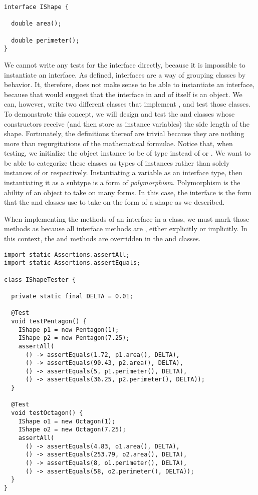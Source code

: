 \begin{lstlisting}[language=MyJava]
interface IShape {

  double area();

  double perimeter();
}
\end{lstlisting}

We cannot write any tests for the  interface directly, because it is impossible to instantiate an interface. 
As defined, interfaces are a way of grouping classes by behavior. 
It, therefore, does not make sense to be able to instantiate an interface, because that would suggest that the interface in and of itself is an object.
We can, however, write two different classes that implement , and test those classes. 
To demonstrate this concept, we will design and test the  and  classes whose constructors receive (and then store as instance variables) the side length of the shape. 
Fortunately, the definitions thereof are trivial because they are nothing more than regurgitations of the mathematical formulae. 
Notice that, when testing, we initialize the object instance to be of type  instead of  or . 
We want to be able to categorize these classes as types of  instances rather than solely instances of  or  respectively. 
Instantiating a variable as an interface type, then instantiating it as a subtype is a form of \emph{polymorphism}. 
Polymorphism is the ability of an object to take on many forms. 
In this case, the  interface is the form that the  and  classes use to take on the form of a shape as we described. 

When implementing the methods of an interface in a class, we must mark those methods as  because all interface methods are , either explicitly or implicitly. 
In this context, the  and  methods are overridden in the  and  classes.

\begin{lstlisting}[language=MyJava]
import static Assertions.assertAll;
import static Assertions.assertEquals;

class IShapeTester {

  private static final DELTA = 0.01;
  
  @Test
  void testPentagon() {
    IShape p1 = new Pentagon(1);
    IShape p2 = new Pentagon(7.25);
    assertAll(
      () -> assertEquals(1.72, p1.area(), DELTA),
      () -> assertEquals(90.43, p2.area(), DELTA),
      () -> assertEquals(5, p1.perimeter(), DELTA),
      () -> assertEquals(36.25, p2.perimeter(), DELTA));
  }

  @Test
  void testOctagon() {
    IShape o1 = new Octagon(1);
    IShape o2 = new Octagon(7.25);
    assertAll(
      () -> assertEquals(4.83, o1.area(), DELTA),
      () -> assertEquals(253.79, o2.area(), DELTA),
      () -> assertEquals(8, o1.perimeter(), DELTA),
      () -> assertEquals(58, o2.perimeter(), DELTA));
  }
}
\end{lstlisting}

